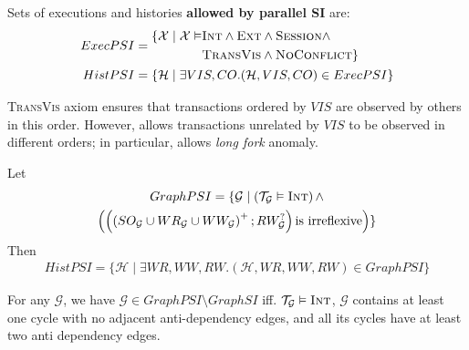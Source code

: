 \documentclass{beamer}
\begin{document}
\begin{frame}
	\begin{definition}
		Sets of executions and histories \textbf{allowed by parallel SI} are:
		$$
		\begin{aligned}
		ExecPSI = {} &
		\begin{aligned}
			\{
				\mathcal{X} \mid
				\mathcal{X} \vDash & \textsc{Int} \wedge \textsc{Ext} \wedge \textsc{Session} \wedge \\
				& \textsc{TransVis} \wedge \textsc{NoConflict}
			\}
		\end{aligned}
		\\
		HistPSI = {} & \{ \mathcal{H} \mid \exists VIS, CO. (\mathcal{H}, VIS, CO) \in ExecPSI \}
		\end{aligned}
		$$
	\end{definition}
	\begin{definition}
		\textsc{TransVis} axiom ensures that transactions ordered by $VIS$ are observed by others in this order. However, allows transactions unrelated by $VIS$ to be observed in different orders; in particular, allows \textit{long fork} anomaly.
	\end{definition}
\end{frame}

\begin{frame}
	\begin{theorem}
	Let
		\begin{multline*}
		GraphPSI = \{ \mathcal{G} \mid \left( \mathcal{T}_\mathcal{G} \vDash \textsc{Int} \right) \wedge \\
			\left(
				\left(
					\left(
					SO_\mathcal{G} \cup WR_\mathcal{G} \cup WW_\mathcal{G}
					\right)^+; RW_\mathcal{G}^?
				\right) \text{is irreflexive}
			\right)
		\}
		\end{multline*}
		Then
		\begin{multline*}
		HistPSI = \{ \mathcal{H} \mid  \exists WR,WW,RW.
		 (\mathcal{H}, WR, WW, RW) \in GraphPSI \}
		\end{multline*}
	\end{theorem}
\end{frame}

\begin{frame}
	\begin{theorem}
		For any $\mathcal{G}$, we have $\mathcal{G} \in GraphPSI \setminus GraphSI $ iff. $\mathcal{T}_\mathcal{G} \vDash \textsc{Int}$, $\mathcal{G}$ contains at least one cycle with no adjacent anti-dependency edges, and all its cycles have at least two anti dependency edges.
	\end{theorem}
\end{frame}
\end{document}
